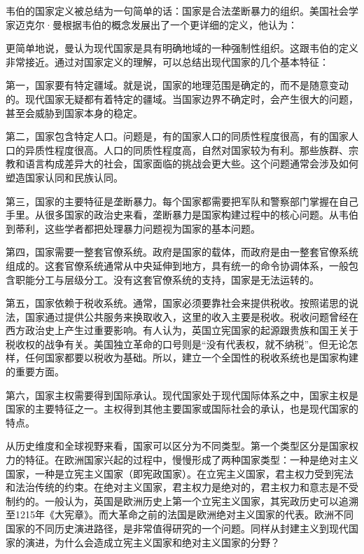 韦伯的国家定义被总结为一句简单的话：国家是合法垄断暴力的组织。美国社会学家迈克尔·曼根据韦伯的概念发展出了一个更详细的定义，他认为：


更简单地说，曼认为现代国家是具有明确地域的一种强制性组织。这跟韦伯的定义非常接近。通过对国家定义的理解，可以总结出现代国家的几个基本特征：

第一，国家要有特定疆域。就是说，国家的地理范围是确定的，而不是随意变动的。现代国家无疑都有着特定的疆域。当国家边界不确定时，会产生很大的问题，甚至会威胁到国家本身的稳定。

第二，国家包含特定人口。问题是，有的国家人口的同质性程度很高，有的国家人口的异质性程度很高。人口的同质性程度高，自然对国家较为有利。那些族群、宗教和语言构成差异大的社会，国家面临的挑战会更大些。这个问题通常会涉及如何塑造国家认同和民族认同。

第三，国家的主要特征是垄断暴力。每个国家都需要把军队和警察部门掌握在自己手里。从很多国家的政治史来看，垄断暴力是国家构建过程中的核心问题。从韦伯到蒂利，这些学者都把处理暴力问题视为国家的基本问题。

第四，国家需要一整套官僚系统。政府是国家的载体，而政府是由一整套官僚系统组成的。这套官僚系统通常从中央延伸到地方，具有统一的命令协调体系，一般包含职能分工与层级分工。没有这套官僚系统的支持，国家是无法运转的。

第五，国家依赖于税收系统。通常，国家必须要靠社会来提供税收。按照诺思的说法，国家通过提供公共服务来换取收入，这里的收入主要是税收。税收问题曾经在西方政治史上产生过重要影响。有人认为，英国立宪国家的起源跟贵族和国王关于税收权的战争有关。美国独立革命的口号则是“没有代表权，就不纳税”。但无论怎样，任何国家都要以税收为基础。所以，建立一个全国性的税收系统也是国家构建的重要方面。

第六，国家主权需要得到国际承认。现代国家处于现代国际体系之中，国家主权是国家的主要特征之一。主权得到其他主要国家或国际社会的承认，也是现代国家的特点。

从历史维度和全球视野来看，国家可以区分为不同类型。第一个类型区分是国家权力的特征。在欧洲国家兴起的过程中，慢慢形成了两种国家类型：一种是绝对主义国家，一种是立宪主义国家（即宪政国家）。在立宪主义国家，君主权力受到宪法和法治传统的约束。在绝对主义国家，君主权力是绝对的，君主权力和意志是不受制约的。一般认为，英国是欧洲历史上第一个立宪主义国家，其宪政历史可以追溯至1215年《大宪章》。而大革命之前的法国是欧洲绝对主义国家的代表。欧洲不同国家的不同历史演进路径，是非常值得研究的一个问题。同样从封建主义到现代国家的演进，为什么会造成立宪主义国家和绝对主义国家的分野？


